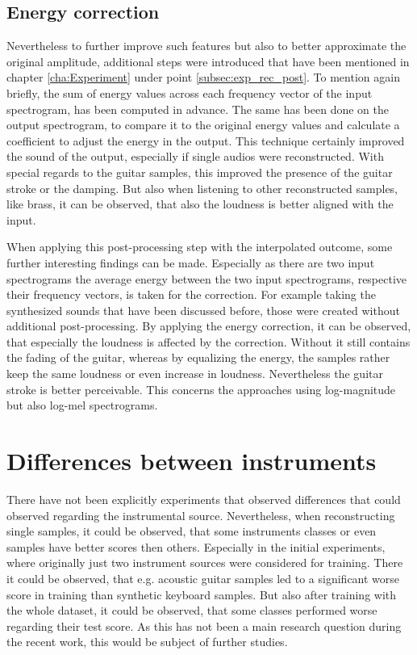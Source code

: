 \subsection{Energy correction}
Nevertheless to further improve such features but also to better approximate the original amplitude, additional steps were introduced that have been mentioned in chapter \ref{cha:Experiment} under point \ref{subsec:exp_rec_post}. To mention again briefly, the sum of energy values across each frequency vector of the input spectrogram, has been computed in advance. The same has been done on the output spectrogram, to compare it to the original energy values and calculate a coefficient to adjust the energy in the output. This technique certainly improved the sound of the output, especially if single audios were reconstructed. With special regards to the guitar samples, this improved the presence of the guitar stroke or the damping. But also when listening to other reconstructed samples, like brass, it can be observed, that also the loudness is better aligned with the input.

When applying this post-processing step with the interpolated outcome, some further interesting findings can be made. Especially as there are two input spectrograms the average energy between the two input spectrograms, respective their frequency vectors, is taken for the correction. For example taking the synthesized sounds that have been discussed before, those were created without additional post-processing. By applying the energy correction, it can be observed, that especially the loudness is affected by the correction. Without it still contains the fading of the guitar, whereas by equalizing the energy, the samples rather keep the same loudness or even increase in loudness. Nevertheless the guitar stroke is better perceivable. This concerns the approaches using log-magnitude but also log-mel spectrograms. 

\section{Differences between instruments}
There have not been explicitly experiments that observed differences that could observed regarding the instrumental source. Nevertheless, when reconstructing single samples, it could be observed, that some instruments classes or even samples have better scores then others. Especially in the initial experiments, where originally just two instrument sources were considered for training. There it could be observed, that e.g. acoustic guitar samples led to a significant worse score in training than synthetic keyboard samples. But also after training with the whole dataset, it could be observed, that some classes performed worse regarding their test score. As this has not been a main research question during the recent work, this would be subject of further studies. 

